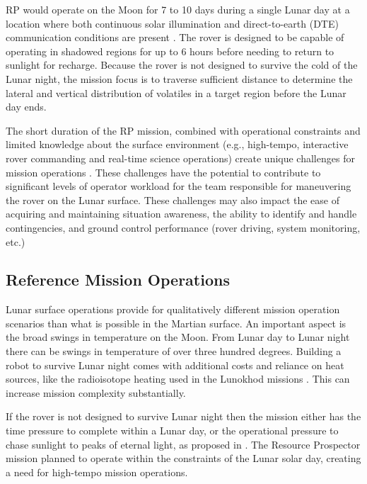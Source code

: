 \documentclass[twocolumn,letterpaper]{IEEEAerospaceCLS}  %
\begin{document}
RP would operate on the Moon for 7 to 10 days during a single Lunar day at a location where both continuous solar illumination and direct-to-earth (DTE) communication conditions are present \cite{trimble2016lunar}.  
The rover is designed to be capable of operating in shadowed regions for up to 6 hours before needing to return to sunlight for recharge.  
Because the rover is not designed to survive the cold of the Lunar night, the mission focus is to traverse sufficient distance to determine the lateral and vertical distribution of volatiles in a target region before the Lunar day ends.

The short duration of the RP mission, combined with operational constraints and limited knowledge about the surface environment (e.g., high-tempo, interactive rover commanding and real-time science operations) create unique challenges for mission operations \cite{hooey2017modeling}.  
These challenges have the potential to contribute to significant levels of operator workload for the team responsible for maneuvering the rover on the Lunar surface.  
These challenges may also impact the ease of acquiring and maintaining situation awareness, the ability to identify and handle contingencies, and ground control performance (rover driving, system monitoring, etc.)

\subsection{Reference Mission Operations}
Lunar surface operations provide for qualitatively different mission operation scenarios than what is possible in the Martian surface.
An important aspect is the broad swings in temperature on the Moon.  
From Lunar day to Lunar night there can be swings in temperature of over three hundred degrees.  
Building a robot to survive Lunar night comes with additional costs and reliance on heat sources, like the radioisotope heating used in the Lunokhod missions \cite{ulamec2010survive}.
This can increase mission complexity substantially.  

If the rover is not designed to survive Lunar night then the mission either has the time pressure to complete within a Lunar day, or the operational pressure to chase sunlight to peaks of eternal light, as proposed in \cite{otten2018strategic}.
The Resource Prospector mission planned to operate within the constraints of the Lunar solar day, creating a need for high-tempo mission operations.  
\end{document}
